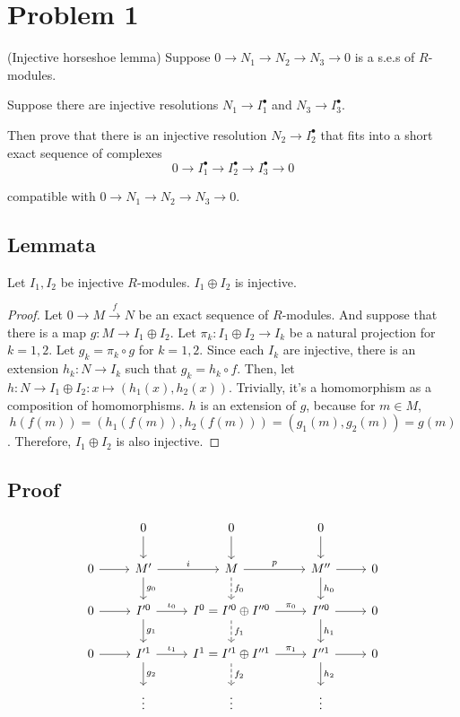 \section*{Problem 1}

(Injective horseshoe lemma)
Suppose \(0 \to N_1 \to N_2 \to N_3 \to 0\)
is a s.e.s of \(R\)-modules.

Suppose there are injective resolutions
\(N_1 \to I_1^\bullet\)
and
\(N_3 \to I_3^\bullet\).

Then
prove that there is an injective resolution
\(N_2 \to I_2^\bullet\)
that fits into a short exact sequence of complexes
\[0 \to I_1^\bullet \to I_2^\bullet \to I_3^\bullet \to 0\]

compatible with \(0 \to N_1 \to N_2 \to N_3 \to 0\).


\subsection*{Lemmata}

\begin{lemma}\label{lem-prod-inj}
  Let \(I_1, I_2\) be injective \(R\)-modules. \(I_1 \oplus I_2\) is injective.
\end{lemma}
\begin{proof}
  Let \(0 \to M \xrightarrow{f} N\) be an exact sequence of \(R\)-modules.
  And suppose that there is a map \(g: M \to I_1 \oplus I_2\).
  Let \(\pi_k: I_1 \oplus I_2 \to I_k\) be a natural projection for \(k = 1, 2\).
  Let \(g_k = \pi_k \circ g\) for \(k = 1, 2\).
  Since each \(I_k\) are injective, there is an extension \(h_k: N \to I_k\)
  such that \(g_k = h_k \circ f\).
  Then, let \(h: N \to I_1 \oplus I_2: x \mapsto (h_1(x), h_2(x))\).
  Trivially, it's a homomorphism as a composition of homomorphisms.
  \(h\) is an extension of \(g\), because for \(m \in M\),
  \[h(f(m)) = (h_1(f(m)), h_2(f(m))) = (g_1(m), g_2(m)) = g(m)\].
  Therefore, \(I_1 \oplus I_2\) is also injective.
\end{proof}


\subsection*{Proof}

\[
\begin{tikzcd}
& 0 \ar{d} & 0 \ar{d} & 0 \ar{d} & \\
0 \ar{r} & M' \ar["i"]{r} \ar["g_0"]{d} & M \ar["p"]{r} \ar[dashed, "f_0"]{d} & M'' \ar{r} \ar["h_0"]{d} & 0 \\
0 \ar{r} & I'^0 \ar["\iota_0"]{r} \ar["g_1"]{d} & I^0 = I'^0 \oplus I''^0 \ar["\pi_0"]{r} \ar[dashed,"f_1"]{d} & I''^0 \ar{r} \ar["h_1"]{d} & 0 \\
0 \ar{r} & I'^1 \ar["\iota_1"]{r} \ar["g_2"]{d} & I^1 = I'^1 \oplus I''^1 \ar["\pi_1"]{r} \ar[dashed,"f_2"]{d} & I''^1 \ar{r} \ar["h_2"]{d} & 0 \\
 & \vdots& \vdots & \vdots &
\end{tikzcd}
\]

